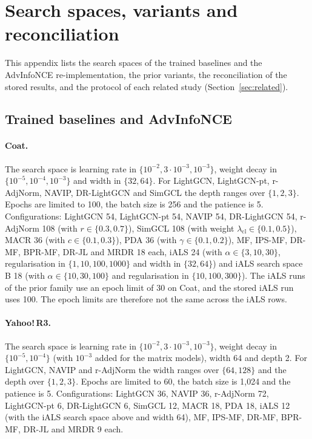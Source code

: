 \section{Search spaces, variants and reconciliation}\label{app:search}

This appendix lists the search spaces of the trained baselines and the AdvInfoNCE re-implementation, the prior
variants, the reconciliation of the stored results, and the protocol of each related study (Section~\ref{sec:related}).

\subsection{Trained baselines and AdvInfoNCE}\label{sec:grids}

\paragraph{Coat.}
The search space is learning rate in $\{10^{-2},3\cdot10^{-3},10^{-3}\}$, weight decay in $\{10^{-5},10^{-4},10^{-3}\}$
and width in $\{32,64\}$. For LightGCN, LightGCN-pt, r-AdjNorm, NAVIP, DR-LightGCN and SimGCL the depth ranges
over $\{1,2,3\}$. Epochs are limited to 100, the batch size is 256 and the patience is 5. Configurations: LightGCN
54, LightGCN-pt 54, NAVIP 54, DR-LightGCN 54, r-AdjNorm 108 (with $r\in\{0.3,0.7\}$), SimGCL 108 (with weight
$\lambda_{\mathrm{cl}}\in\{0.1,0.5\}$), MACR 36 (with $c\in\{0.1,0.3\}$), PDA 36 (with $\gamma\in\{0.1,0.2\}$),
MF, IPS-MF, DR-MF, BPR-MF, DR-JL and MRDR 18 each, iALS 24 (with $\alpha\in\{3,10,30\}$, regularisation in
$\{1,10,100,1000\}$ and width in $\{32,64\}$) and iALS search space B 18 (with $\alpha\in\{10,30,100\}$ and regularisation
in $\{10,100,300\}$). The iALS runs of the prior family use an epoch limit of 30 on Coat, and the stored iALS run
uses 100. The epoch limits are therefore not the same across the iALS rows.

\paragraph{Yahoo!\,R3.}
The search space is learning rate in $\{10^{-2},3\cdot10^{-3},10^{-3}\}$, weight decay in $\{10^{-5},10^{-4}\}$ (with
$10^{-3}$ added for the matrix models), width 64 and depth 2. For LightGCN, NAVIP and r-AdjNorm the width ranges
over $\{64,128\}$ and the depth over $\{1,2,3\}$. Epochs are limited to 60, the batch size is 1{,}024 and the
patience is 5. Configurations: LightGCN 36, NAVIP 36, r-AdjNorm 72, LightGCN-pt 6, DR-LightGCN 6, SimGCL 12, MACR
18, PDA 18, iALS 12 (with the iALS search space above and width 64), MF, IPS-MF, DR-MF, BPR-MF, DR-JL and MRDR 9 each.


